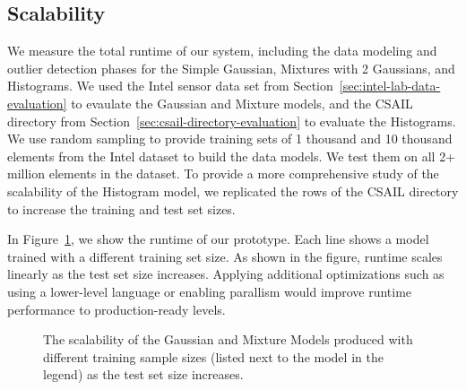 \subsection{Scalability}
\label{sec:performance-evaluation}

We measure the total runtime of our system, including the data modeling and outlier detection phases for the Simple Gaussian, Mixtures with 2 Gaussians, and Histograms. 
We used the Intel sensor data set from Section~\ref{sec:intel-lab-data-evaluation} to evaulate the Gaussian and Mixture models, and the CSAIL directory from Section~\ref{sec:csail-directory-evaluation} to evaluate the Histograms. 
We use random sampling to provide training sets of 1 thousand and 10 thousand elements from the Intel dataset to build the data models.
We test them on all 2+ million elements in the dataset.
To provide a more comprehensive study of the scalability of the Histogram model, we replicated the rows of the CSAIL directory to increase the training and test set sizes. 

In Figure~\ref{fig:scaling}, we show the runtime of our prototype. Each line shows a model trained with a different training set size. As shown in the figure, runtime scales linearly as the test set size increases.
Applying additional optimizations such as using a lower-level language or enabling parallism would improve runtime performance to production-ready levels. 

\begin{figure}
\centering
{}
\caption{The scalability of the Gaussian and Mixture Models produced with different training sample sizes (listed next to the model in the legend) as the test set size increases.}
\label{fig:scaling}
\end{figure}
